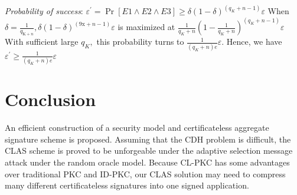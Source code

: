 \documentclass[11pt]{article}
\begin{document}
\textit{Probability of success}: \(\varepsilon^{\prime}=\operatorname{Pr}[E 1 \wedge E 2 \wedge E 3] \ge \delta(1-\delta)^{\left(q_{K}+n-1\right)} \varepsilon\)
When \(\delta=\frac{1}{q_{\mathrm{K}+n}}, \delta(1-\delta)^{(9 \mathrm{x}+n-1)} \varepsilon\) is maximized at
\(\frac{1}{q_{K}+n}\left(1-\frac{1}{q_{K}+n}\right)^{\left(q_{K}+n-1\right)} \varepsilon\)
With sufficient large \(q_{K},\) this probability turns to \(\frac{1}{\left(q_{K}+n\right) e} \varepsilon .\) Hence, we have \(\varepsilon^{\prime} \ge \frac{1}{\left(q_{K}+n\right) e} \varepsilon\)




\section{Conclusion}
An efficient construction of a security model and certificateless aggregate signature scheme is proposed. Assuming that the CDH problem is difficult, the CLAS scheme is proved to be unforgeable under the adaptive selection message attack under the random oracle model. Because CL-PKC has some advantages over traditional PKC and ID-PKC, our CLAS solution may need to compress many different certificateless signatures into one signed application.\\
\end{document}
